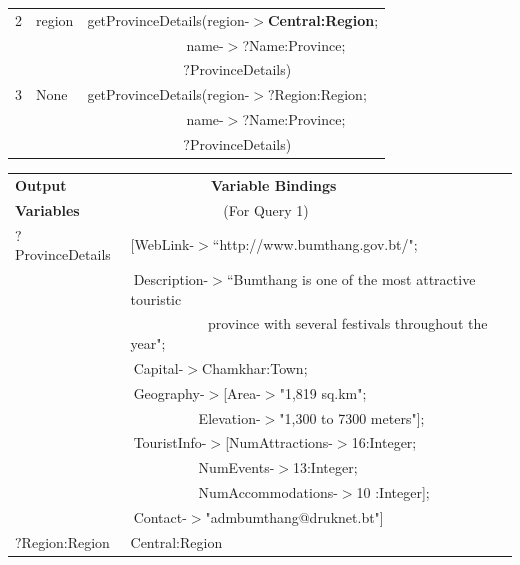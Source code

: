\documentclass[a4paper,9pt]{beamer}
\begin{document}
{\begin{table} [tbph]
\begin{tabular}{|l|l|l|}
 \hline
 2&region & getProvinceDetails(region-$>$\textbf{{\color{blue}Central}:Region};\\
  &        &$~~~~~~~~~~~~~~~~~~~~~~~~~~~~~~~~$name-$>$?Name:Province; \\
  &        &$~~~~~~~~~~~~~~~~~~~~~~~~~~~~~~~${\color{red}$?$ProvinceDetails})\\
 \hline
 3&None & getProvinceDetails(region-$>?$Region:Region;\\
  &        &$~~~~~~~~~~~~~~~~~~~~~~~~~~~~~~~~$name-$>$?Name:Province; \\
  &        &$~~~~~~~~~~~~~~~~~~~~~~~~~~~~~~~${\color{red}$?$ProvinceDetails})\\         
\hline
\end{tabular} 
\end{table}
\footnotesize
\pause 
\begin{table} [tbph]
\centering
\begin{tabular}{|l|l|}
\hline
 \textbf{Output} &$~~~~~~~~~~~~~~~~~~~~~~~~~~$\textbf{Variable Bindings} \\
 \textbf{Variables}&$~~~~~~~~~~~~~~~~~~~~~~~~~~~~~~$(For Query 1)            \\
\hline
 {\color{red}$?$ProvinceDetails}&[WebLink-$>$``http://www.bumthang.gov.bt/";\\
          &$~$Description-$>$``Bumthang is one of the most attractive touristic  \\
        &$~~~~~~~~~~~~~~~~~~~~~~~~~$province with several festivals throughout the year";\\
        &$~$Capital-$>$Chamkhar:Town; \\
        &$~$Geography-$>$[Area-$>$"1,819 sq.km";\\
        &$~~~~~~~~~~~~~~~~~~~~~~$Elevation-$>$"1,300 to 7300 meters"];\\
        &$~$TouristInfo-$>$[NumAttractions-$>$16:Integer;\\ 
           &$~~~~~~~~~~~~~~~~~~~~~~$NumEvents-$>$13:Integer; \\
				   &$~~~~~~~~~~~~~~~~~~~~~~$NumAccommodations-$>$10 :Integer]; \\
	      &$~$Contact-$>$"admbumthang@druknet.bt"] \\
 \hline
 {\color{red}$?$Region:Region}&Central:Region\\
\hline
\end{tabular} 
\end{table}
}
\end{document}
